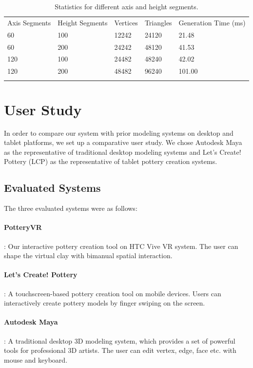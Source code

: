 \documentclass{svjour3}                     %
\begin{document}
\begin{table}
\caption{Statistics for different axis and height segments.}
\label{tab:1}       %
\begin{tabular}{lllll}
\hline\noalign{\smallskip}
Axis Segments & Height Segments & Vertices & Triangles & Generation Time (ms)\\
\noalign{\smallskip}\hline\noalign{\smallskip}
60 & 100 & 12242 & 24120 & 21.48 \\
60 & 200 & 24242 & 48120 & 41.53 \\
120 & 100 & 24482 & 48240 & 42.02 \\
120 & 200 & 48482 & 96240 & 101.00 \\
\noalign{\smallskip}\hline
\end{tabular}
\end{table}

\section{User Study}
\label{sec:6}
In order to compare our system with prior modeling systems on desktop and tablet platforms, we set up a comparative user study. We chose Autodesk Maya \cite{website:maya} as the representative of traditional desktop modeling systems and Let's Create! Pottery (LCP) \cite{website:letspottery} as the representative of tablet pottery creation systems.

\subsection{Evaluated Systems}
\label{sec:6.1}
The three evaluated systems were as follows:

\paragraph{PotteryVR}: Our interactive pottery creation tool on HTC Vive VR system. The user can shape the virtual clay with bimanual spatial interaction.

\paragraph{Let’s Create! Pottery}: A touchscreen-based pottery creation tool on mobile devices. Users can interactively create pottery models by finger swiping on the screen.

\paragraph{Autodesk Maya}: A traditional desktop 3D modeling system, which provides a set of powerful tools for professional 3D artists. The user can edit vertex, edge, face etc. with mouse and keyboard.
\end{document}
